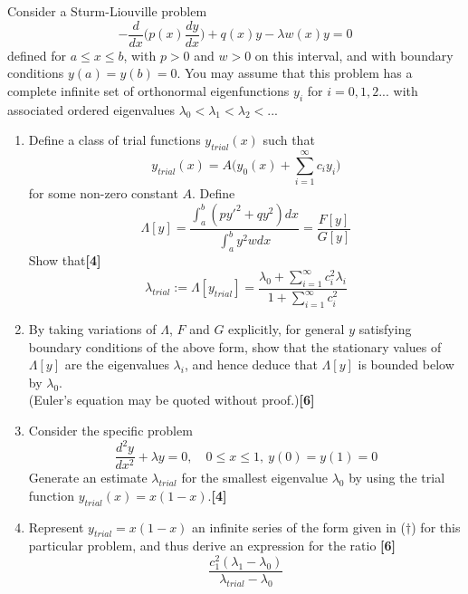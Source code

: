 \documentclass[a4paper]{article}
\begin{document}
\begin{qns}
Consider a Sturm-Liouville problem
$$-\frac{d}{dx}\bigg(p(x)\frac{dy}{dx}\bigg)+q(x)y-\lambda w(x)y=0$$
defined for $a\leq x\leq b$, with $p>0$ and $w>0$ on this interval, and with boundary conditions $y(a)=y(b)=0$. You may assume that this problem has a complete infinite set of orthonormal eigenfunctions $y_i$ for $i=0,1,2...$ with associated ordered eigenvalues $\lambda_0<\lambda_1<\lambda_2<...$
\begin{enumerate}[label=(\alph*)]
    \item Define a class of trial functions $y_{trial}(x)$ such that
\begin{equation}
y_{trial}(x)=A\bigg(y_0(x)+\sum_{i=1}^\infty c_iy_i\bigg)\tag{\dag}
\end{equation}
for some non-zero constant $A$. Define
$$\Lambda[y]=\frac{\int_a^b(py'^2+qy^2)dx}{\int_a^by^2wdx}=\frac{F[y]}{G[y]}$$
Show that\hfill \textbf{[4]}
\begin{equation}
\lambda_{trial}:=\Lambda[y_{trial}]=\frac{\lambda_0+\sum_{i=1}^\infty c_i^2\lambda_i}{1+\sum_{i=1}^\infty c_i^2}\tag{*}
\end{equation}
\item By taking variations of $\Lambda$, $F$ and $G$ explicitly, for general $y$ satisfying boundary conditions of the above form, show that the stationary values of $\Lambda[y]$ are the eigenvalues $\lambda_i$, and hence deduce that $\Lambda[y]$ is bounded below by $\lambda_0$.\\[5pt](Euler's equation may be quoted without proof.)\hfill\textbf{[6]}
\item Consider the specific problem
$$\frac{d^2y}{dx^2}+\lambda y=0,\quad 0\leq x\leq 1,~y(0)=y(1)=0$$ Generate an estimate $\lambda_{trial}$ for the smallest eigenvalue $\lambda_0$ by using the trial function $y_{trial}(x)=x(1-x)$.\hfill \textbf{[4]}
\item Represent $y_{trial}=x(1-x)$ an infinite series of the form given in ($\dag$) for this particular problem, and thus derive an expression for the ratio \hfill \textbf{[6]}
$$\frac{c_1^2(\lambda_1-\lambda_0)}{\lambda_{trial}-\lambda_0}$$
\end{enumerate}
\end{qns}
\newpage
\end{document}
